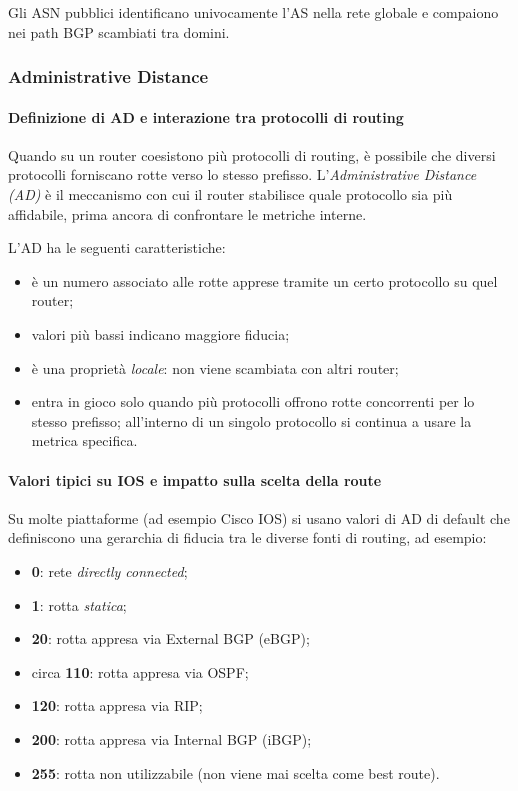 Gli ASN pubblici identificano univocamente l’AS nella rete globale e compaiono nei path BGP scambiati tra domini.

\subsubsection{Administrative Distance}

\paragraph{Definizione di AD e interazione tra protocolli di routing}

Quando su un router coesistono più protocolli di routing, è possibile che diversi protocolli forniscano rotte verso lo stesso prefisso. L’\emph{Administrative Distance (AD)} è il meccanismo con cui il router stabilisce quale protocollo sia più affidabile, prima ancora di confrontare le metriche interne.

L’AD ha le seguenti caratteristiche:
\begin{itemize}
    \item è un numero associato alle rotte apprese tramite un certo protocollo su quel router;
    \item valori più bassi indicano maggiore fiducia;
    \item è una proprietà \emph{locale}: non viene scambiata con altri router;
    \item entra in gioco solo quando più protocolli offrono rotte concorrenti per lo stesso prefisso; all’interno di un singolo protocollo si continua a usare la metrica specifica.
\end{itemize}

\paragraph{Valori tipici su IOS e impatto sulla scelta della route}

Su molte piattaforme (ad esempio Cisco IOS) si usano valori di AD di default che definiscono una gerarchia di fiducia tra le diverse fonti di routing, ad esempio:
\begin{itemize}
    \item \textbf{0}: rete \emph{directly connected};
    \item \textbf{1}: rotta \emph{statica};
    \item \textbf{20}: rotta appresa via External BGP (eBGP);
    \item circa \textbf{110}: rotta appresa via OSPF;
    \item \textbf{120}: rotta appresa via RIP;
    \item \textbf{200}: rotta appresa via Internal BGP (iBGP);
    \item \textbf{255}: rotta non utilizzabile (non viene mai scelta come best route).
\end{itemize}

